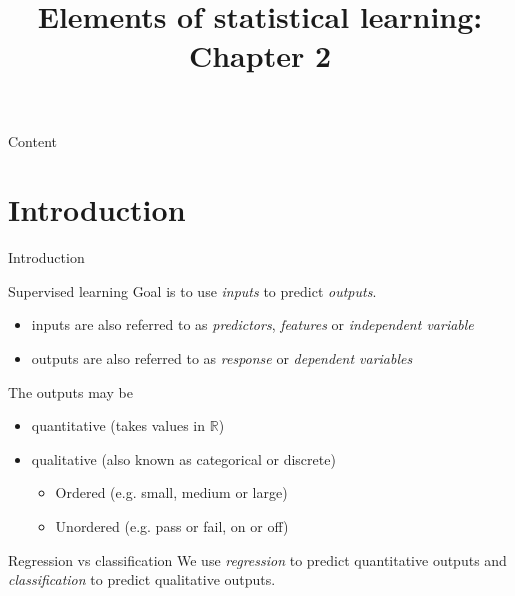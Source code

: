 \documentclass{beamer}
\title{Elements of statistical learning:
Chapter 2}
\begin{document}
\maketitle

\begin{frame}{Content}
\tableofcontents
\end{frame}

\section{Introduction}

\begin{frame}{Introduction}
\begin{block}{Supervised learning}
Goal is to use \textit{inputs} to predict \textit{outputs}.
\end{block}
\begin{itemize}
\item{inputs} are also referred to as \textit{predictors}, \textit{features} or \textit{independent variable}
\item{outputs} are also referred to as \textit{response} or \textit{dependent variables}
\end{itemize}
\medskip
The outputs may be

\begin{itemize}
\item{} quantitative (takes values in $\mathbb{R}$)
\item{} qualitative (also known as categorical or discrete)
\begin{itemize}
\item{} Ordered (e.g. small, medium or large)
\item{} Unordered (e.g. pass or fail, on or off)
\end{itemize}
\end{itemize}
\begin{block}{Regression vs classification}
We use \textit{regression} to predict quantitative outputs and \textit{classification} to predict qualitative outputs.
\end{block}
\end{frame}
\end{document}
